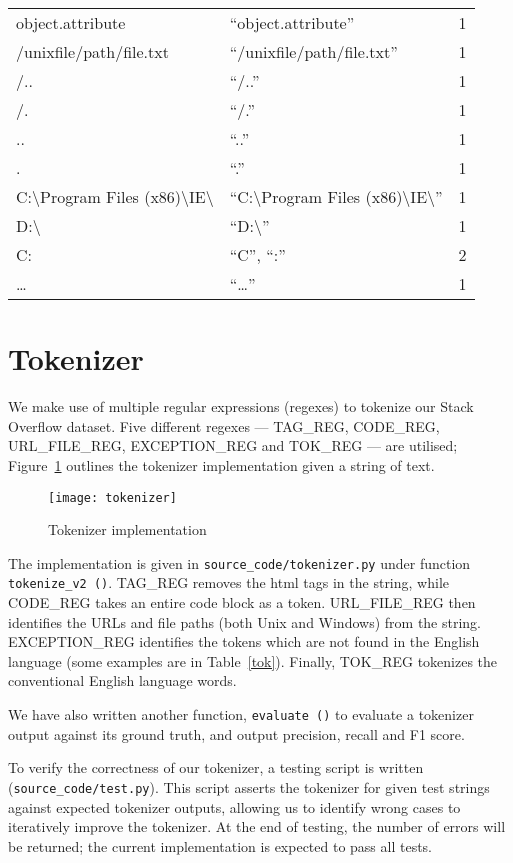 \begin{table}
\begin{tabu}{X[5,l]X[5,l]X[2,l]}
    object.attribute & ``object.attribute'' & 1 \\
    /unixfile/path/file.txt & ``/unixfile/path/file.txt'' & 1 \\
    /.. & ``/..'' & 1 \\
    /. & ``/.'' & 1 \\
    .. & ``..'' & 1 \\
    . & ``.'' & 1 \\
    C:\textbackslash{}Program Files (x86)\textbackslash{}IE\textbackslash{}
    & ``C:\textbackslash{}Program Files (x86)\textbackslash{}IE\textbackslash{}''
    & 1 \\
    D:\textbackslash{} & ``D:\textbackslash{}'' & 1 \\
    C\@: & ``C'', ``:'' & 2 \\
    \ldots & ``\ldots'' & 1 \\
\end{tabu}
\end{table}
\twocolumn

\section{Tokenizer}

We make use of multiple regular expressions (regexes) to tokenize our Stack
Overflow dataset. Five different regexes --- TAG\_REG, CODE\_REG, URL\_FILE\_REG,
EXCEPTION\_REG and TOK\_REG --- are utilised; Figure~\ref{img:tok} outlines the
tokenizer implementation given a string of text.

\begin{figure}[htp]
\texttt{[image: tokenizer]}
\caption{Tokenizer implementation}\label{img:tok}
\end{figure}

The implementation is given in \texttt{source\_code/tokenizer.py} under function
\texttt{tokenize\_v2\,()}.
TAG\_REG removes the html tags in the string, while CODE\_REG takes an entire code
block as a token. URL\_FILE\_REG then identifies the URLs and file paths (both Unix
and Windows) from the string. EXCEPTION\_REG identifies the tokens which are not
found in the English language (some examples are in Table~\ref{tok}). Finally,
TOK\_REG tokenizes the conventional English language words.

We have also written another function, \texttt{evaluate\,()} to evaluate
a tokenizer output against its ground truth, and output precision, recall and
F1 score.

To verify the correctness of our tokenizer, a testing script is written
(\texttt{source\_code/test.py}). This
script asserts the tokenizer for given test strings against expected tokenizer
outputs, allowing us to identify wrong cases to iteratively improve the tokenizer.
At the end of testing, the number of errors will be returned; the current
implementation is expected to pass all tests.

